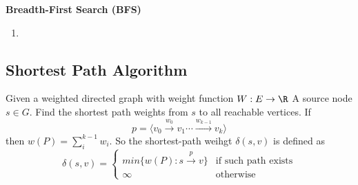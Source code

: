 \documentclass[11pt]{article}
\begin{document}
\begin{defn*}
\textbf{Breadth-First Search (BFS)}
  \begin{enumerate}
    \item
    \begin{algorithm}[H]


     \end{algorithm}
   \end{enumerate}
\end{defn*}



\subsection*{Shortest Path Algorithm}
Given a weighted directed graph with weight function $W: E\to \R$ A source node $s\in G$. Find the shortest path weights from $s$ to all reachable vertices. If
\[
  p = \langle v_0 \overset{w_0}{\to} v_1 \cdots \overset{w_{k-1}}{\to} v_k \rangle
\]
then $w(P) = \sum_{i}^{k-1} w_i$. So the shortest-path weihgt $\delta(s, v)$ is defined as
\[
  \delta(s, v) =
  \begin{cases*}
    min\{ w(P): s \overset{p}{\to} v \} & \text{if such path exists}\\
    \infty & \text{otherwise}
  \end{cases*}
\]
\end{document}
